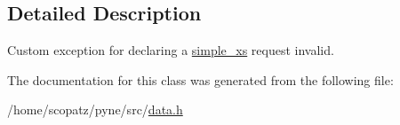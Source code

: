 \subsection{Detailed Description}
Custom exception for declaring a \hyperlink{structsimple__xs}{simple\-\_\-xs} request invalid. 

The documentation for this class was generated from the following file\-:\begin{DoxyCompactItemize}
\item 
/home/scopatz/pyne/src/\hyperlink{data_8h}{data.\-h}\end{DoxyCompactItemize}
